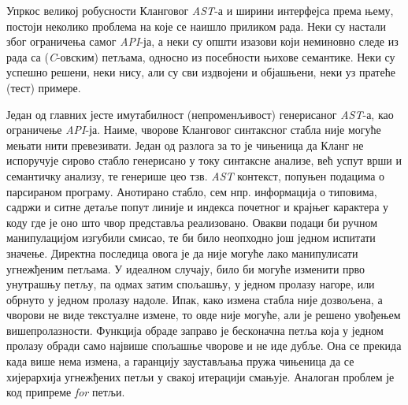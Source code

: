 \documentclass[a4paper]{article}
\begin{document}
Упркос великој робусности Кланговог \textit{AST}-а и ширини интерфејса према њему, постоји неколико проблема на које се наишло приликом рада. Неки су настали због ограничења самог \textit{API}-ја, а неки су општи изазови који неминовно следе из рада са (\textit{C}-овским) петљама, односно из посебности њихове семантике. Неки су успешно решени, неки нису, али су сви издвојени и објашњени, неки уз пратеће (тест) примере.

Један од главних јесте имутабилност (непроменљивост) генерисаног \textit{AST}-а, као ограничење \textit{API}-ја. Наиме, чворове Кланговог синтаксног стабла није могуће мењати нити превезивати. Један од разлога за то је чињеница да Кланг не испоручује сирово стабло генерисано у току синтаксне анализе, већ успут врши и семантичку анализу, те генерише цео тзв. \textit{AST} контекст, попуњен подацима о парсираном програму. Анотирано стабло, сем нпр. информација о типовима, садржи и ситне детаље попут линије и индекса почетног и крајњег карактера у коду где је оно што чвор представља реализовано. Овакви подаци би ручном манипулацијом изгубили смисао, те би било неопходно још једном испитати значење. Директна последица овога је да није могуће лако манипулисати угнежђеним петљама. У идеалном случају, било би могуће изменити прво унутрашњу петљу, па одмах затим спољашњу, у једном пролазу нагоре, или обрнуто у једном пролазу надоле. Ипак, како измена стабла није дозвољена, а чворови не виде текстуалне измене, то овде није могуће, али је решено увођењем вишепролазности. Функција обраде заправо је бесконачна петља која у једном пролазу обради само највише спољашње чворове и не иде дубље. Она се прекида када више нема измена, а гаранцију заустављања пружа чињеница да се хијерархија угнежђених петљи у свакој итерацији смањује. Аналоган проблем је код припреме \textit{for} петљи.
\end{document}
